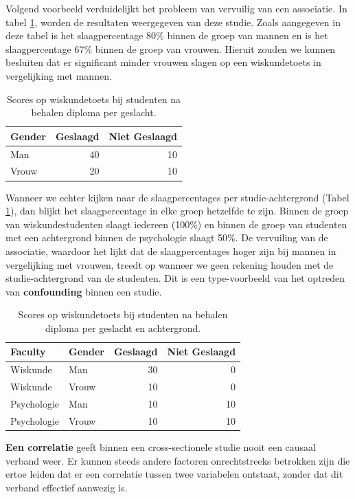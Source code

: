 \documentclass[
]{book}
\theoremstyle{definition}
\theoremstyle{definition}
\theoremstyle{definition}
\theoremstyle{definition}
\theoremstyle{remark}
\begin{document}
Volgend voorbeeld verduidelijkt het probleem van vervuilig van een associatie. In tabel \ref{tab:aggr}, worden de resultaten weergegeven van deze studie. Zoals aangegeven in deze tabel is het slaagpercentage 80\% binnen de groep van mannen en is het slaagpercentage 67\% binnen de groep van vrouwen. Hieruit zouden we kunnen besluiten dat er significant minder vrouwen slagen op een wiskundetoets in vergelijking met mannen.

\begin{table}

\caption{\label{tab:aggr}Scores op wiskundetoets bij studenten na behalen diploma per geslacht.}
\centering
\begin{tabular}[t]{lrr}
\toprule
Gender & Geslaagd & Niet Geslaagd\\
\midrule
Man & 40 & 10\\
Vrouw & 20 & 10\\
\bottomrule
\end{tabular}
\end{table}

Wanneer we echter kijken naar de slaagpercentages per studie-achtergrond (Tabel \ref{tab:aggr}), dan blijkt het slaagpercentage in elke groep hetzelfde te zijn. Binnen de groep van wiskundestudenten slaagt iedereen (100\%) en binnen de groep van studenten met een achtergrond binnen de psychologie slaagt 50\%. De vervuiling van de associatie, waardoor het lijkt dat de slaagpercentages hoger zijn bij mannen in vergelijking met vrouwen, treedt op wanneer we geen rekening houden met de studie-achtergrond van de studenten. Dit is een type-voorbeeld van het optreden van \textbf{confounding} binnen een studie.

\begin{table}

\caption{\label{tab:cond}Scores op wiskundetoets bij studenten na behalen diploma per geslacht en achtergrond.}
\centering
\begin{tabular}[t]{llrr}
\toprule
Faculty & Gender & Geslaagd & Niet Geslaagd\\
\midrule
Wiskunde & Man & 30 & 0\\
Wiskunde & Vrouw & 10 & 0\\
Psychologie & Man & 10 & 10\\
Psychologie & Vrouw & 10 & 10\\
\bottomrule
\end{tabular}
\end{table}

\textbf{Een correlatie} geeft binnen een cross-sectionele studie nooit een causaal verband weer. Er kunnen steeds andere factoren onrechtstreeks betrokken zijn die ertoe leiden dat er een correlatie tussen twee variabelen ontstaat, zonder dat dit verband effectief aanwezig is.
\end{document}
